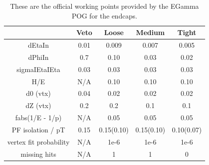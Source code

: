 \begin{table}[htb]
\caption{%
    These are the official working points provided by the EGamma POG for the endcaps.
}
\begin{center}
  \begin{tabular}{ | c | c | c | c | c |} \hline
    & Veto& Loose& Medium& Tight \\ \hline \hline
    dEtaIn	 &0.01	 &0.009	 &0.007	 &0.005 \\ \hline
    dPhiIn	 &0.7	 &0.10	 &0.03	 &0.02 \\ \hline
    sigmaIEtaIEta	 &0.03	 &0.03	 &0.03	 &0.03 \\ \hline
    H/E	 &N/A	 &0.10	 &0.10	 &0.10 \\ \hline
    d0 (vtx)	 &0.04	 &0.02	 &0.02	 &0.02 \\ \hline
    dZ (vtx)	 &0.2	 &0.2	 &0.1	 &0.1 \\ \hline
    fabs(1/E - 1/p)	 &N/A	 &0.05	 &0.05	 &0.05 \\ \hline
    PF isolation / pT	 &0.15	 &0.15(0.10)	 &0.15(0.10)	 &0.10(0.07) \\ \hline
    vertex fit probability	 &N/A	 &1e-6	 &1e-6	 &1e-6 \\ \hline
    missing hits	 &N/A	 &1	 &1	 &0 \\ \hline


\end{tabular}
\end{center}
\label{tab:electronworkingpoints_endcaps}
\end{table}



